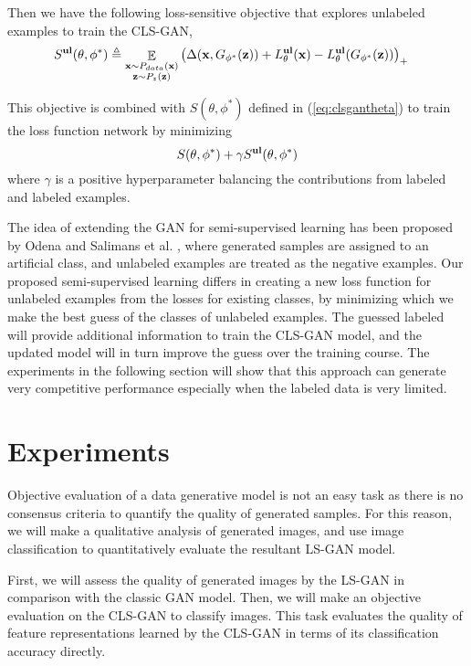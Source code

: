 \documentclass[11pt,fullpage, letterpaper,twoside]{article}
\newcommand{\1}[1]{\mathds{1}_{\left[#1\right]}}
\begin{document}
Then we have the following loss-sensitive objective that explores unlabeled examples to train the CLS-GAN,
\begin{align}
&S^{\bf ul}(\theta,\phi^*) \triangleq
\mathop \mathbb E\limits_{\substack{\mathbf x\sim P_{data}(\mathbf x) \\\nonumber
\mathbf z\sim P_z(\mathbf z)}} \big(\Delta(\mathbf x, G_{\phi^*}(\mathbf z))+L_\theta^{\bf ul}(\mathbf x)-L_\theta^{\bf ul}(G_{\phi^*}(\mathbf z))\big)_+
\end{align}

This objective is combined with $S(\theta,\phi^*)$ defined in (\ref{eq:clsgantheta}) to train the loss function network by minimizing
$$
S(\theta,\phi^*)+\gamma S^{\bf ul}(\theta,\phi^*)
$$
where $\gamma$ is a positive hyperparameter balancing the contributions from labeled and labeled examples.

The idea of extending the GAN for semi-supervised learning has been proposed by Odena \cite{odena2016semi} and
Salimans et al. \cite{salimans2016improved}, where generated samples are assigned to an artificial class, and unlabeled examples are treated as the negative examples.
Our proposed semi-supervised learning differs in creating a new loss function for unlabeled examples from the losses for existing classes, by minimizing which we make the best guess of the classes of unlabeled examples. The guessed labeled will provide additional information to train the CLS-GAN model, and the updated model will in turn improve the guess over the training course.
The experiments in the following section will show that this approach can generate very competitive performance especially when the labeled data is very limited.

\section{Experiments}\label{sec:exp}

Objective evaluation of a data generative model is not an easy task as there is no consensus criteria to quantify the quality of generated samples.  For this reason, we will make a qualitative analysis of generated images, and use image classification to quantitatively evaluate the resultant LS-GAN model.

First, we will assess the quality of generated images by the LS-GAN in comparison with the classic GAN model. Then, we will make an objective evaluation on the CLS-GAN to classify images. This task evaluates the quality of feature representations learned by the CLS-GAN in terms of its classification accuracy directly. 
\end{document}
